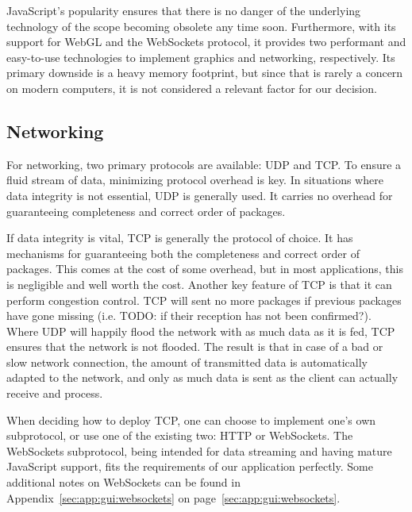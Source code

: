 JavaScript's  popularity ensures  that there  is no  danger of  the underlying
technology  of  the  scope   becoming  obsolete  any  time  soon. Furthermore,
with  its support  for  WebGL and  the WebSockets  protocol,  it provides  two
performant and easy-to-use technologies  to implement graphics and networking,
respectively. Its primary downside is a heavy memory footprint, but since that
is  rarely a  concern on  modern computers,  it is  not considered  a relevant
factor for our decision.

%
%
\subsection{Networking} %
\label{subsec:gui:networking}

For networking, two primary protocols are available: UDP and TCP.  To ensure a
fluid stream of data, minimizing protocol overhead is key. In situations where
data integrity is not essential, UDP is generally used. It carries no overhead
for guaranteeing completeness and correct order of packages.

If data  integrity is vital, TCP  is generally the protocol  of choice. It has
mechanisms  for  guaranteeing  both  the completeness  and  correct  order  of
packages.  This comes at the cost  of some overhead, but in most applications,
this is negligible and well worth the cost. Another key feature of TCP is that
it can perform congestion control. TCP will  sent no more packages if previous
packages  have  gone missing  (i.e. TODO:  if  their  reception has  not  been
confirmed?).  Where UDP will happily flood the network with as much data as it
is fed,  TCP ensures that  the network is not  flooded. The result is  that in
case of a  bad or slow network  connection, the amount of  transmitted data is
automatically adapted  to the network,  and only as much  data is sent  as the
client can actually receive and process.

When  deciding how  to  deploy TCP,  one  can choose  to  implement one's  own
subprotocol,  or  use  one  of   the  existing  two: HTTP  or  WebSockets. The
WebSockets  subprotocol,   being  intended  for  data   streaming  and  having
mature  JavaScript   support,  fits   the  requirements  of   our  application
perfectly.    Some  additional   notes   on  WebSockets   can   be  found   in
Appendix~\ref{sec:app:gui:websockets} on page~\ref{sec:app:gui:websockets}.

